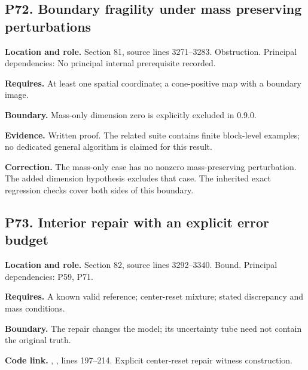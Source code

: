 \documentclass[11pt,oneside,openany]{book}
\numberwithin{equation}{section}
\begin{document}
\par\noindent\begin{minipage}{\textwidth}
\subsection{P72. Boundary fragility under mass preserving
perturbations}\label{LSMRegister:p72.-boundary-fragility-under-mass-preserving-perturbations}

\textbf{Location and role.} Section 81, source lines 3271--3283.
Obstruction. Principal dependencies: No principal internal prerequisite
recorded.

\textbf{Requires.} At least one spatial coordinate; a cone-positive map
with a boundary image.

\textbf{Boundary.} Mass-only dimension zero is explicitly excluded in
0.9.0.

\textbf{Evidence.} Written proof. The related suite contains finite
block-level examples; no dedicated general algorithm is claimed for this
result.

\textbf{Correction.} The mass-only case has no nonzero mass-preserving
perturbation. The added dimension hypothesis excludes that case. The
inherited exact regression checks cover both sides of this boundary.
\end{minipage}\par\medskip

\par\noindent\begin{minipage}{\textwidth}
\subsection{P73. Interior repair with an explicit error
budget}\label{LSMRegister:p73.-interior-repair-with-an-explicit-error-budget}

\textbf{Location and role.} Section 82, source lines 3292--3340. Bound.
Principal dependencies: P59, P71.

\textbf{Requires.} A known valid reference; center-reset mixture; stated
discrepancy and mass conditions.

\textbf{Boundary.} The repair changes the model; its uncertainty tube
need not contain the original truth.

\textbf{Code link.} ,
, lines 197--214. Explicit center-reset repair
witness construction.
\end{minipage}\par\medskip
\end{document}

